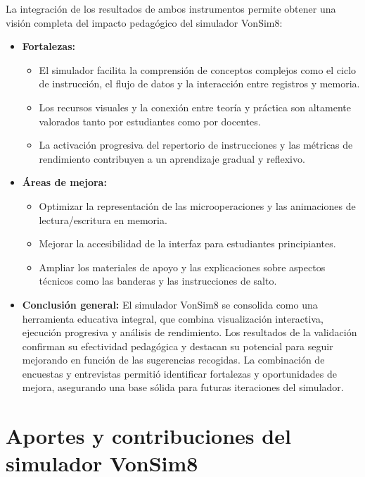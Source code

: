 \documentclass[12pt,oneside]{templates/unerthesis}
\providecommand{\tightlist}{%
  \setlength{\itemsep}{0pt}\setlength{\parskip}{0pt}}
\begin{document}
La integración de los resultados de ambos instrumentos permite obtener una visión completa del impacto pedagógico del simulador VonSim8:

\begin{itemize}
\tightlist
\item
  \textbf{Fortalezas:}

  \begin{itemize}
  \tightlist
  \item
    El simulador facilita la comprensión de conceptos complejos como el ciclo de instrucción, el flujo de datos y la interacción entre registros y memoria.
  \item
    Los recursos visuales y la conexión entre teoría y práctica son altamente valorados tanto por estudiantes como por docentes.
  \item
    La activación progresiva del repertorio de instrucciones y las métricas de rendimiento contribuyen a un aprendizaje gradual y reflexivo.
  \end{itemize}
\item
  \textbf{Áreas de mejora:}

  \begin{itemize}
  \tightlist
  \item
    Optimizar la representación de las microoperaciones y las animaciones de lectura/escritura en memoria.
  \item
    Mejorar la accesibilidad de la interfaz para estudiantes principiantes.
  \item
    Ampliar los materiales de apoyo y las explicaciones sobre aspectos técnicos como las banderas y las instrucciones de salto.
  \end{itemize}
\item
  \textbf{Conclusión general:}
  El simulador VonSim8 se consolida como una herramienta educativa integral, que combina visualización interactiva, ejecución progresiva y análisis de rendimiento. Los resultados de la validación confirman su efectividad pedagógica y destacan su potencial para seguir mejorando en función de las sugerencias recogidas. La combinación de encuestas y entrevistas permitió identificar fortalezas y oportunidades de mejora, asegurando una base sólida para futuras iteraciones del simulador.
\end{itemize}

\hypertarget{aportes-y-contribuciones-del-simulador-vonsim8}{%
\section{Aportes y contribuciones del simulador VonSim8}\label{aportes-y-contribuciones-del-simulador-vonsim8}}
\end{document}
